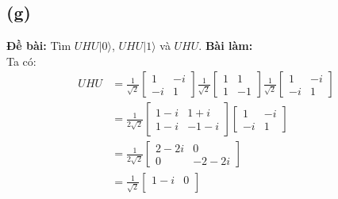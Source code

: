 \subsection{(g)}
\textbf{Đề bài:} Tìm $UHU|0\rangle$, $UHU|1\rangle$ và $UHU$.
\textbf{Bài làm:}\\
Ta có:
\begin{align*}
    UHU                   & = \frac{1}{\sqrt{2}}\begin{bmatrix}
                                                    1  & -i \\
                                                    -i & 1
                                                \end{bmatrix}
    \frac{1}{\sqrt{2}}\begin{bmatrix}
                          1 & 1  \\
                          1 & -1
                      \end{bmatrix}
    \frac{1}{\sqrt{2}}\begin{bmatrix}
                          1  & -i \\
                          -i & 1
                      \end{bmatrix}                              \\
                          & = \frac{1}{2\sqrt{2}}\begin{bmatrix}
                                                     1 - i & 1 + i   \\
                                                     1 - i & - 1 - i
                                                 \end{bmatrix}
    \begin{bmatrix}
        1  & -i \\
        -i & 1
    \end{bmatrix}                                                \\
                          & = \frac{1}{2\sqrt{2}}\begin{bmatrix}
                                                     2 - 2i & 0       \\
                                                     0      & -2 - 2i
                                                 \end{bmatrix} \\
                          & = \frac{1}{\sqrt{2}}\begin{bmatrix}
                                                    1 - i & 0      \\

\end{bmatrix}
\end{align*}
